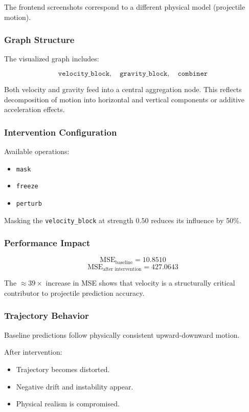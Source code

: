 \documentclass[12pt,singleside,a4paper]{article}
\begin{document}
The frontend screenshots correspond to a different physical model (projectile motion).

\subsubsection{Graph Structure}

The visualized graph includes:

\[
\texttt{velocity\_block}, \quad
\texttt{gravity\_block}, \quad
\texttt{combiner}
\]

Both velocity and gravity feed into a central aggregation node. This reflects decomposition of motion into horizontal and vertical components or additive acceleration effects.

\subsubsection{Intervention Configuration}

Available operations:
\begin{itemize}
    \item \texttt{mask}
    \item \texttt{freeze}
    \item \texttt{perturb}
\end{itemize}

Masking the \texttt{velocity\_block} at strength $0.50$ reduces its influence by 50\%.

\subsubsection{Performance Impact}

\[
\text{MSE}_{\text{baseline}} = 10.8510
\]
\[
\text{MSE}_{\text{after intervention}} = 427.0643
\]

The $\approx 39\times$ increase in MSE shows that velocity is a structurally critical contributor to projectile prediction accuracy.

\subsubsection{Trajectory Behavior}

Baseline predictions follow physically consistent upward-downward motion.

After intervention:
\begin{itemize}
    \item Trajectory becomes distorted.
    \item Negative drift and instability appear.
    \item Physical realism is compromised.
\end{itemize}
\end{document}
